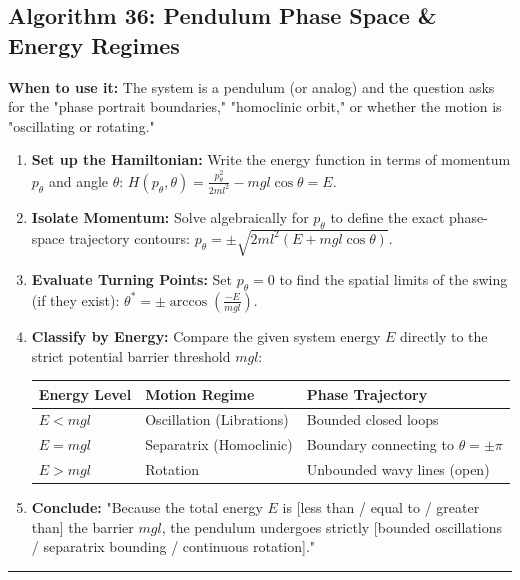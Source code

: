 \documentclass[11pt, a4paper]{report}
\begin{document}
\subsection*{Algorithm 36: Pendulum Phase Space \& Energy Regimes}
\textbf{When to use it:} The system is a pendulum (or analog) and the question asks for the "phase portrait boundaries," "homoclinic orbit," or whether the motion is "oscillating or rotating."
\begin{enumerate}[label=\textbf{\arabic*.}]
    \item \textbf{Set up the Hamiltonian:} Write the energy function in terms of momentum $p_\theta$ and angle $\theta$: $H(p_\theta, \theta) = \frac{p_\theta^2}{2ml^2} - mgl\cos\theta = E$.
    \item \textbf{Isolate Momentum:} Solve algebraically for $p_\theta$ to define the exact phase-space trajectory contours: $p_\theta = \pm \sqrt{2ml^2(E + mgl\cos\theta)}$.
    \item \textbf{Evaluate Turning Points:} Set $p_\theta = 0$ to find the spatial limits of the swing (if they exist): $\theta^* = \pm \arccos\left(\frac{-E}{mgl}\right)$.
    \item \textbf{Classify by Energy:} Compare the given system energy $E$ directly to the strict potential barrier threshold $mgl$:
    \begin{center}
    \begin{tabular}{|l|l|l|}
    \hline
    \textbf{Energy Level} & \textbf{Motion Regime} & \textbf{Phase Trajectory} \\ \hline
    $E < mgl$ & Oscillation (Librations) & Bounded closed loops \\ \hline
    $E = mgl$ & Separatrix (Homoclinic) & Boundary connecting to $\theta = \pm \pi$ \\ \hline
    $E > mgl$ & Rotation & Unbounded wavy lines (open) \\ \hline
    \end{tabular}
    \end{center}
    \item \textbf{Conclude:} "Because the total energy $E$ is [less than / equal to / greater than] the barrier $mgl$, the pendulum undergoes strictly [bounded oscillations / separatrix bounding / continuous rotation]."
\end{enumerate}
\vspace{1em}
\noindent\rule{\textwidth}{0.4pt}
\vspace{1em}
\end{document}
